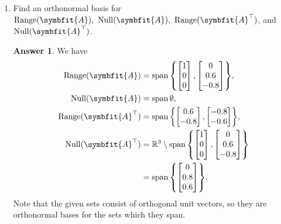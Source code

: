 \documentclass{article}
\theoremstyle{definition}
\newtheorem*{answer}{Answer}
\newcommand{\reals} {\mathbb{R}}
\newcommand{\mat}[1]{\symbfit{#1}}
\DeclareMathOperator{\range}{Range}
\DeclareMathOperator{\nullsp}{Null}
\DeclareMathOperator{\spn}{span}
\begin{document}
\begin{enumerate}[leftmargin=\labelsep]
\begin{enumerate}
		      \item Find an orthonormal basis for \(\range(\mat{A}),\ \nullsp(\mat{A}),\ \range(\mat{A}^\top)\), and \(\nullsp(\mat{A}^\top)\).
		            \begin{answer}
			            We have
			            \begin{alignat*}{4}
				            \range(\mat{A})       & = \spn \qty{\begin{bmatrix}1\\ 0\\ 0\end{bmatrix}, \begin{bmatrix} 0\\ 0.6\\ -0.8\end{bmatrix}},                   \\
				            \nullsp(\mat{A})      & = \spn \emptyset,                                                                                                  \\
				            \range(\mat{A}^\top)  & = \spn \qty{\begin{bmatrix}0.6\\ -0.8\end{bmatrix}, \begin{bmatrix}-0.8\\ -0.6\end{bmatrix}},                      \\
				            \nullsp(\mat{A}^\top) & = \reals^3 \setminus \spn \qty{\begin{bmatrix}1\\ 0\\ 0\end{bmatrix}, \begin{bmatrix} 0\\ 0.6\\ -0.8\end{bmatrix}} \\
				                                  & = \spn \qty{\begin{bmatrix} 0\\ 0.8\\ 0.6\end{bmatrix}}.
			            \end{alignat*}
			            Note that the given sets consist of orthogonal unit vectors, so they are orthonormal bases for the sets which they span.
		            \end{answer}


\end{enumerate}
\end{enumerate}
\end{document}

